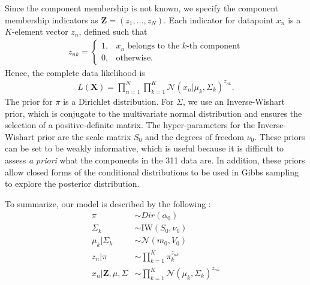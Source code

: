 \documentclass[twoside]{article}
\newcommand{\N}{\mathcal{N}}
\theoremstyle{theorem}
\theoremstyle{theorem}
\theoremstyle{theorem}
\theoremstyle{lemma}
\theoremstyle{definition}
\theoremstyle{example}
\begin{document}
Since the component membership is not known, we specify the component membership indicators as $\mathbf{Z} = (z_1, \ldots, z_N)$. Each indicator for datapoint $x_n$ is a $K$-element vector $z_n$, defined such that \begin{align}
z_{nk} = \begin{cases}
1, & x_n\text{ belongs to the $k$-th component}\\
0, & \text{otherwise}. 
\end{cases}
\end{align}
Hence, the complete data likelihood is 
\begin{align}
L(\mathbf{X}) = \prod_{n=1}^N\prod_{k=1}^K \N(x_n| \mu_k, \Sigma_k)^{z_{nk}}.
\end{align}
The prior for $\pi$ is a Dirichlet distribution. For $\Sigma$, we use an Inverse-Wishart prior, which is conjugate to the multivariate normal distribution and ensures the selection of a positive-definite matrix. The hyper-parameters for the Inverse-Wishart prior are the scale matrix $S_0$ and the degrees of freedom $\nu_0$.  These priors can be set to be weakly informative, which is useful because it is difficult to assess \textit{a priori} what the components in the 311 data are. In addition, these priors allow closed forms of the conditional distributions to be used in Gibbs sampling to explore the posterior distribution. 

To summarize, our model is described by the following \cite{Gelman, Jones}: 
\begin{align}
\pi &\sim Dir(\alpha_0)\\
\Sigma_k &\sim \mathrm{IW}(S_0, \nu_0)\\
\mu_k | \Sigma_k &\sim \N(m_0, V_0)\\
z_n | \pi &\sim \prod_{k=1}^K \pi_k^{z_{nk}}\\
x_n | \mathbf{Z}, \mu, \Sigma &\sim \prod_{k=1}^K \N(\mu_k, \Sigma_k)^{z_{nk}}
\end{align}
\end{document}
